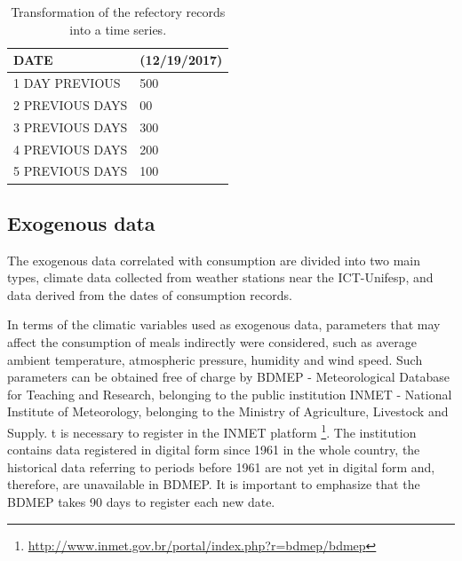             \begin{table}[!ht]
                \centering
                \begin{tabular}{l|l}
                \hline
                    DATE                  & (12/19/2017) \\ \hline
                1 DAY PREVIOUS    & 500        \\
                2 PREVIOUS DAYS & 00                            \\
                3 PREVIOUS DAYS & 300                            \\
                4 PREVIOUS DAYS & 200                            \\
                5 PREVIOUS DAYS & 100                          \\ \hline 
                \end{tabular}
                \caption{Transformation of the refectory records into a time series.}
                \label{table:transformacaodadosrestaurante}
            \end{table}
           
        \subsection{Exogenous data} \label{subsec:coleta_exógenos}
            The exogenous data correlated with consumption are divided into two main types, climate data collected from weather stations near the ICT-Unifesp, and data derived from the dates of consumption records.
    
      	 In terms of the climatic variables used as exogenous data, parameters that may affect the consumption of meals indirectly were considered, such as average ambient temperature, atmospheric pressure, humidity and wind speed. Such parameters can be obtained free of charge by BDMEP - Meteorological Database for Teaching and Research, belonging to the public institution INMET - National Institute of Meteorology, belonging to the Ministry of Agriculture, Livestock and Supply. t is necessary to register in the INMET platform
  \footnote{\url{http://www.inmet.gov.br/portal/index.php?r=bdmep/bdmep}}. The institution contains data registered in digital form since 1961 in the whole country, the historical data referring to periods before 1961 are not yet in digital form and, therefore, are unavailable in BDMEP. It is important to emphasize that the BDMEP takes 90 days to register each new date. 
            	
